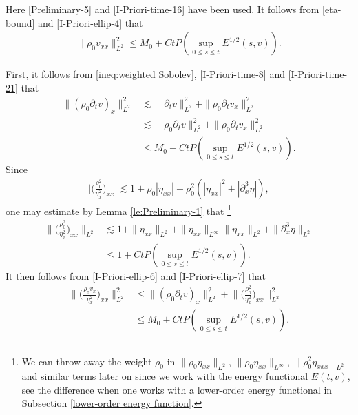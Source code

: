 \documentclass[11pt, reqno]{amsart}
\numberwithin{equation}{section}
\begin{document}
Here \eqref{Preliminary-5} and \eqref{I-Priori-time-16} have been used.
It follows from \eqref{eta-bound} and \eqref{I-Priori-ellip-4} that
\begin{equation}\label{I-Priori-ellip-5}
\begin{aligned}
\|\rho_0v_{xx}\|_{L^2}^2\leq M_0+Ct P(\sup_{0\leq s\leq t}E^{1/2}(s,v)).
\end{aligned}
\end{equation}

\bigskip
{}
First, it follows from \eqref{ineq:weighted Sobolev}, \eqref{I-Priori-time-8} and \eqref{I-Priori-time-21} that
\begin{equation}\label{I-Priori-ellip-6}
\begin{aligned}
\|(\rho_0\partial_tv)_x\|_{L^2}^2
&\lesssim \|\partial_tv\|_{L^2}^2+\|\rho_0\partial_tv_x\|_{L^2}^2\\
&\lesssim \|\rho_0\partial_tv\|_{L^2}^2+\|\rho_0\partial_tv_x\|_{L^2}^2\\
&\leq M_0+Ct P(\sup_{0\leq s\leq t}E^{1/2}(s,v)).
\end{aligned}
\end{equation}
Since
\begin{equation*}
\begin{aligned}
\bigg|\bigg({\frac{\rho_0^2}{\eta_x^2}}\bigg)_{xx}\bigg|\lesssim 1+\rho_0|\eta_{xx}|+\rho_0^2(|\eta_{xx}|^2+|\partial_x^3\eta|),
\end{aligned}
\end{equation*}
one may estimate by Lemma \ref{le:Preliminary-1} that
\footnote{We can throw away the weight \(\rho_0\) in \(\|\rho_0\eta_{xx}\|_{L^2}\), \(\|\rho_0\eta_{xx}\|_{L^\infty}\), \(\|\rho_0^2\eta_{xxx}\|_{L^2}\) and similar terms later on since we work with the energy functional \(E(t,v)\), see the difference when one works with a lower-order energy functional in Subsection \ref{lower-order energy function}.}
\begin{equation}\label{I-Priori-ellip-7}
\begin{aligned}
\bigg\|\bigg({\frac{\rho_0^2}{\eta_x^2}}\bigg)_{xx}\bigg\|_{L^2}
&\lesssim 1+\|\eta_{xx}\|_{L^2}+\|\eta_{xx}\|_{L^\infty}\|\eta_{xx}\|_{L^2}+\|\partial_x^3\eta\|_{L^2}\\
&\leq 1+Ct P(\sup_{0\leq s\leq t}E^{1/2}(s,v)).
\end{aligned}
\end{equation}
It then follows from \eqref{I-Priori-ellip-6} and \eqref{I-Priori-ellip-7} that
\begin{equation}\label{I-Priori-ellip-10}
\begin{aligned}
\bigg\|\bigg({\frac{\rho_0v_x}{\eta_x^2}}\bigg)_{xx}\bigg\|_{L^2}^2
&\leq \|(\rho_0\partial_tv)_x\|_{L^2}^2+\bigg\|\bigg({\frac{\rho_0^2}{\eta_x^2}}\bigg)_{xx}\bigg\|_{L^2}^2\\
&\leq M_0+Ct P(\sup_{0\leq s\leq t}E^{1/2}(s,v)).
\end{aligned}
\end{equation}
\end{document}
